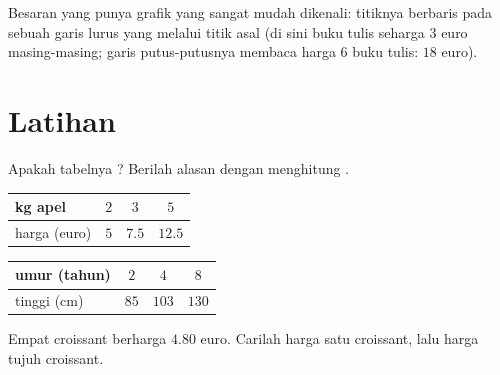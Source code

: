 \begin{omfigure}

{\small Besaran yang  punya grafik yang sangat mudah dikenali:
titiknya berbaris pada sebuah garis lurus yang melalui titik asal (di
sini buku tulis seharga $3$ euro masing-masing; garis putus-putusnya
membaca harga $6$ buku tulis: $18$ euro).}
\end{omfigure}

\section{Latihan}

\begin{exercise}[$\star$]\label{exo:g6:propdata:1}
Apakah tabelnya ? Berilah alasan dengan menghitung .
\begin{center}
\renewcommand{\arraystretch}{1.2}
\begin{tabular}{l|ccc}
kg apel & $2$ & $3$ & $5$ \\
\hline
harga (euro) & $5$ & $7.5$ & $12.5$ \\
\end{tabular}
\qquad
\begin{tabular}{l|ccc}
umur (tahun) & $2$ & $4$ & $8$ \\
\hline
tinggi (cm) & $85$ & $103$ & $130$ \\
\end{tabular}
\end{center}
\end{exercise}

\begin{exercise}[$\star$]\label{exo:g6:propdata:2}
Empat croissant berharga $4.80$ euro. Carilah harga satu croissant,
lalu harga tujuh croissant.
\end{exercise}

